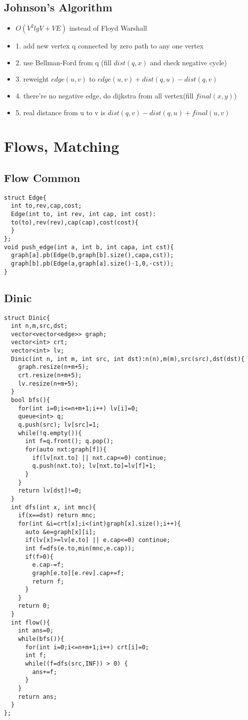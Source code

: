 \documentclass[landscape, 8pt, a4paper, oneside, twocolumn]{extarticle}
\begin{document}
\subsection{Johnson's Algorithm}
\begin{itemize}
    \item $ O(V ^ {2} lg V + VE) $ instead of Floyd Warshall
    \item 1. add new vertex q connected by zero path to any one vertex 
    \item 2. use Bellman-Ford from q (fill $ dist(q,x) $ and check negative cycle)
    \item 3. reweight $ edge(u,v) $ to $ edge(u,v) + dist(q,u) - dist(q,v) $
    \item 4. there're no negative edge, do dijkstra from all vertex(fill $ final(x,y) $)
    \item 5. real distance from u to v is $ dist(q,v) - dist(q,u) + final(u,v) $    
\end{itemize}

\section{Flows, Matching}
\subsection{Flow Common}
\begin{verbatim}
struct Edge{
  int to,rev,cap,cost;
  Edge(int to, int rev, int cap, int cost):
  to(to),rev(rev),cap(cap),cost(cost){
  }
};
void push_edge(int a, int b, int capa, int cst){
  graph[a].pb(Edge(b,graph[b].size(),capa,cst));
  graph[b].pb(Edge(a,graph[a].size()-1,0,-cst));
}
\end{verbatim}

\subsection{Dinic}
\begin{verbatim}
struct Dinic{
  int n,m,src,dst;
  vector<vector<edge>> graph;
  vector<int> crt;
  vector<int> lv;
  Dinic(int n, int m, int src, int dst):n(n),m(m),src(src),dst(dst){
    graph.resize(n+m+5);
    crt.resize(n+m+5);
    lv.resize(n+m+5);
  }
  bool bfs(){
    for(int i=0;i<=n+m+1;i++) lv[i]=0;
    queue<int> q;
    q.push(src); lv[src]=1;
    while(!q.empty()){
      int f=q.front(); q.pop();
      for(auto nxt:graph[f]){
        if(lv[nxt.to] || nxt.cap<=0) continue;
        q.push(nxt.to); lv[nxt.to]=lv[f]+1;
      }
    }
    return lv[dst]!=0;
  }
  int dfs(int x, int mnc){
    if(x==dst) return mnc;
    for(int &i=crt[x];i<(int)graph[x].size();i++){
      auto &e=graph[x][i];
      if(lv[x]>=lv[e.to] || e.cap<=0) continue;
      int f=dfs(e.to,min(mnc,e.cap));
      if(f>0){
        e.cap-=f;
        graph[e.to][e.rev].cap+=f;
        return f;
      }
    }
    return 0;
  }
  int flow(){
    int ans=0;
    while(bfs()){
      for(int i=0;i<=n+m+1;i++) crt[i]=0;
      int f;
      while((f=dfs(src,INF)) > 0) {
        ans+=f;
      }
    }
    return ans;
  }
};
\end{verbatim}
\end{document}
